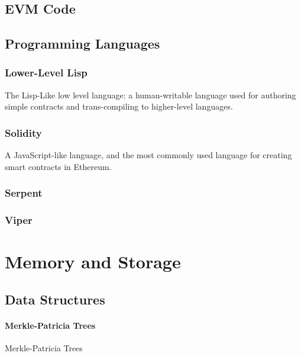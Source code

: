 \documentclass[10pt,a4paper,leqno,bibliography=totoc]{scrartcl}
\newenvironment{alphafootnotes}
{\par\edef\savedfootnotenumber{\number\value{footnote}}
\renewcommand{\thefootnote}{\alph{footnote}}
\setcounter{footnote}{0}}
{\par\setcounter{footnote}{\savedfootnotenumber}}
\begin{document}
\begin{alphafootnotes}
\begin{multicols*}{2}
		\subsection{EVM Code}
		
 		\subsection{Programming Languages}

		\subsubsection{Lower-Level Lisp}
			The Lisp-Like low level language: a human-writable language used for authoring simple contracts and trans-compiling to higher-level languages.
	
		\subsubsection{Solidity}
			A JavaScript-like language, and the most commonly used language for creating smart contracts in Ethereum.
		\subsubsection{Serpent}
		\subsubsection{Viper}

	\section{Memory and Storage}
			
		\subsection{Data Structures}

				\paragraph{Merkle-Patricia Trees}
					Merkle-Patricia Trees
			

\end{multicols*}
\end{alphafootnotes}
\end{document}
